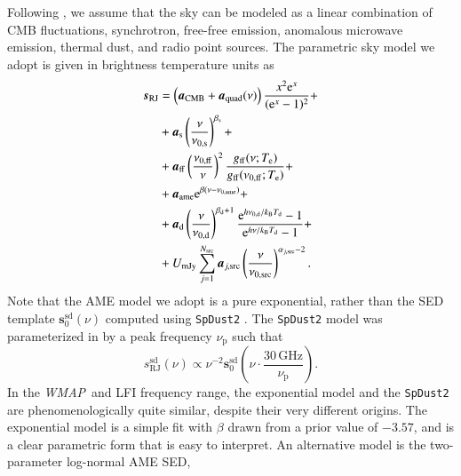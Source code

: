 \documentclass[twocolumn]{../../common/aa}
\def\WMAP{\emph{WMAP}}
\newcommand{\Te}[0]{T_{\rm e}}
\newcommand{\e}{\mathrm e}
\def\Tdust{\ifmmode T_\mathrm{d}\else $T_{\mathrm{d}}$\fi}
\def\bdust{\ifmmode \beta_\mathrm{d}\else $\beta_{\mathrm{d}}$\fi}
\def\bsynch{\ifmmode \beta_\mathrm{s}\else $\beta_{\mathrm{s}}$\fi}
\def\nuzeros{\ifmmode \nu_{0,\mathrm{s}}\else $\nu_{0,\mathrm{s}}$\fi}
\def\nuzeroff{\ifmmode \nu_{0,\mathrm{ff}}\else $\nu_{0,\mathrm{ff}}$\fi}
\def\nuzerod{\ifmmode \nu_{0,\mathrm{d}}\else $\nu_{0,\mathrm{d}}$\fi}
\def\nuzeroame{\ifmmode \nu_{0,\mathrm{ame}}\else $\nu_{0,\mathrm{ame}}$\fi}
\def\nuzerosrc{\ifmmode \nu_{0,\mathrm{src}}\else $\nu_{0,\mathrm{src}}$\fi}
\def\nup{\ifmmode \nu_{\mathrm{p}}\else $\nu_{\mathrm{p}}$\fi}
\def\Te{\ifmmode T_{\mathrm{e}}\else $T_{\mathrm{e}}$\fi}
\def\kB{\ifmmode k_\mathrm{B}\else $k_{\mathrm{B}}$\fi}
\begin{document}
Following \citet{bp01}, we assume that the sky can be modeled as a linear combination of CMB fluctuations, synchrotron, free-free emission, anomalous microwave emission, thermal dust, and radio point sources. The parametric sky model we adopt is given in brightness temperature units as
\begin{align}
  \vec{s}_{\mathrm{RJ}} &= \left(\vec{a}_{\mathrm{CMB}}+\vec{a}_{\mathrm{quad}}(\nu)\right) \frac{x^2 \e^x}{(\e^x -1)^2}+\label{eq:cmb_astsky}\\
  &+ \vec{a}_{\mathrm{s}} \left(\frac{\nu}{\nuzeros}\right)^{\bsynch} + \label{eq:synch_astsky}\\
  &+ \vec{a}_{\mathrm{ff}} \left(\frac{\nuzeroff}{\nu}\right)^2 \frac{g_{\mathrm{ff}}(\nu;\Te) }{g_{\mathrm{ff}}(\nuzeroff;\Te)} +\label{eq:ff_astsky}\\
  &+ \vec{a}_{\mathrm{ame}} \e^{\beta(\nu-\nu_{0,\mathrm{ame}})}+\label{eq:ame_astsky}  \\
  &+ \vec{a}_{\mathrm{d}} \left(\frac{\nu}{\nuzerod}\right)^{\bdust+1} \frac{\e^{h\nuzerod/\kB\Tdust}-1}{\e^{h\nu/\kB\Tdust}-1}+ \label{eq:dust_astsky}\\
  &+ U_{\mathrm{mJy}} \sum_{j=1}^{N_{\mathrm{src}}} \vec{a}_{j,\mathrm{src}} \left(\frac{\nu}{\nuzerosrc}\right)^{\alpha_{j,\mathrm{src}}-2}. \label{eq:sum_ptsrc}
\end{align}
Note that the AME model we adopt is a pure exponential, rather than the SED template $\boldsymbol s_0^\mathrm{sd}(\nu)$ computed using \texttt{SpDust2} \citep{ali-haimoud:2009, ali-haimoud:2010, silsbee:2011}. The \texttt{SpDust2} model was parameterized in \citet{bp01} by a peak frequency $\nu_\mathrm p$ such that
\begin{equation}
	s^\mathrm{sd}_\mathrm{RJ}(\nu)\propto\nu^{-2}\boldsymbol s_0^\mathrm{sd}\left(\nu\cdot\frac{30\,\mathrm{GHz}}{\nu_\mathrm p}\right).
\end{equation}
In the \WMAP\ and LFI frequency range, the exponential model and the \texttt{SpDust2} are phenomenologically quite similar, despite their very different origins. 
The exponential model is a simple fit with $\beta$ drawn from a prior value of $-3.57$, and is a clear parametric form that is easy to interpret. An alternative model is the two-parameter log-normal AME SED,
\end{document}
